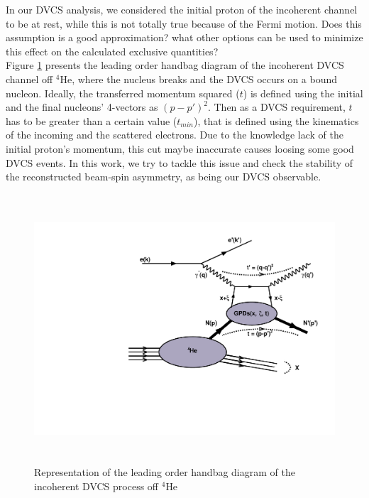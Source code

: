 \documentclass[a4paper,11pt,twoside]{article}
\date{\today}
\begin{document}
\title{}
\maketitle

In our DVCS analysis, we considered the initial proton of the incoherent 
channel to be at rest, while this is not totally true because of the Fermi 
motion. Does this assumption is a good approximation? what other options can be 
used to minimize this effect on the calculated exclusive quantities?\\

Figure \ref{fig:handbag} presents the leading order handbag diagram of the 
incoherent DVCS channel off $^4$He, where the nucleus breaks and the DVCS 
occurs on a bound nucleon. Ideally, the transferred momentum squared ($t$) is 
defined using the initial and the final nucleons' 4-vectors as $(p-p')^{2}$.  
Then as a DVCS requirement, $t$ has to be greater than a certain value 
($t_{min}$), that is defined using the kinematics of the incoming and the 
scattered electrons. Due to the knowledge lack of the initial proton's 
momentum, this cut maybe inaccurate causes loosing some good DVCS events. In 
this work, we try to tackle this issue and check the stability of the 
reconstructed beam-spin asymmetry, as being our DVCS observable.\\ 

\begin{figure}[h!]
\includegraphics[height=10.0cm]{fig/handbag_incoherent.pdf}
\caption{Representation of the leading order handbag diagram of the incoherent 
DVCS process off $^4$He}
\label{fig:handbag}
\end{figure}
\end{document}
